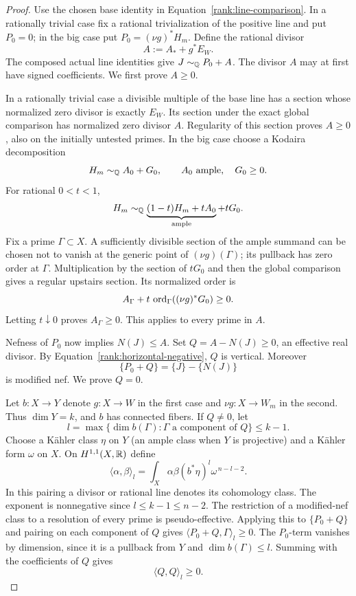 \begin{proof}
Use the chosen base identity in Equation~\eqref{rank:line-comparison}.
In a rationally trivial case fix a rational trivialization of the positive
line and put \(P_0=0\); in the big case put \(P_0=(\nu g)^*H_m\).  Define
the rational divisor
\[
                         A:=A_*+g^*E_W.
\]
The composed actual line identities give \(J\sim_{\mathbb Q}P_0+A\).
The divisor \(A\) may at first have signed coefficients.  We first prove
\(A\geq0\).

In a rationally trivial case a divisible multiple of the base line
has a section whose normalized zero divisor is exactly \(E_W\).
Its section under the exact global comparison has normalized zero
divisor \(A\).  Regularity of this section proves \(A\geq0\),
also on the initially untested primes.
In the big case choose a Kodaira decomposition
\[
                     H_m\sim_{\mathbb Q}A_0+G_0,
                     \qquad A_0\text{ ample},\quad G_0\geq0.
\]
For rational \(0<t<1\),
\[
 H_m\sim_{\mathbb Q}
       \underbrace{(1-t)H_m+tA_0}_{\text{ample}}+tG_0.
\]
Fix a prime \(\Gamma\subset X\).  A sufficiently divisible
section of the ample summand can be chosen not to vanish at the
generic point of \((\nu g)(\Gamma)\); its pullback has zero order
at \(\Gamma\).  Multiplication by the section of \(tG_0\) and
then the global comparison gives a regular upstairs section.
Its normalized order is
\[
               A_\Gamma+
                    t\,\operatorname{ord}_\Gamma((\nu g)^*G_0)\geq0.
\]
Letting \(t\downarrow0\) proves \(A_\Gamma\geq0\).  This applies
to every prime in \(A\).

Nefness of \(P_0\) now implies \(N(J)\leq A\).
Set \(Q=A-N(J)\geq0\), an effective real divisor.  By
Equation~\eqref{rank:horizontal-negative}, \(Q\) is vertical.
Moreover
\[
                    \{P_0+Q\}=\{J\}-\{N(J)\}
\]
is modified nef.  We prove \(Q=0\).

Let \(b:X\to Y\) denote \(g:X\to W\) in the first case and
\(\nu g:X\to W_m\) in the second.  Thus \(\dim Y=k\), and \(b\)
has connected fibers.  If \(Q\ne0\), let
\[
       l=\max\{\dim b(\Gamma):\Gamma\text{ a component of }Q\}
       \leq k-1.
\]
Choose a Kähler class \(\eta\) on \(Y\) (an ample class when \(Y\)
is projective) and a Kähler form \(\omega\) on \(X\).  On
\(H^{1,1}(X,\mathbb R)\) define
\[
 \langle \alpha,\beta\rangle_l
       =\int_X \alpha\beta(b^*\eta)^l\omega^{\,n-l-2}.
\]
In this pairing a divisor or rational line denotes its cohomology class.
The exponent is nonnegative since \(l\leq k-1\leq n-2\).
The restriction of a modified-nef class to a resolution of every
prime is pseudo-effective.  Applying this to \(\{P_0+Q\}\)
and pairing on each component of \(Q\) gives
\(\langle P_0+Q,\Gamma\rangle_l\geq0\).
The \(P_0\)-term vanishes by dimension, since it is a pullback
from \(Y\) and \(\dim b(\Gamma)\leq l\).  Summing with the
coefficients of \(Q\) gives
\begin{equation}
                         \langle Q,Q\rangle_l\geq0.
\label{rank:nonnegative-square}
\end{equation}


\end{proof}
